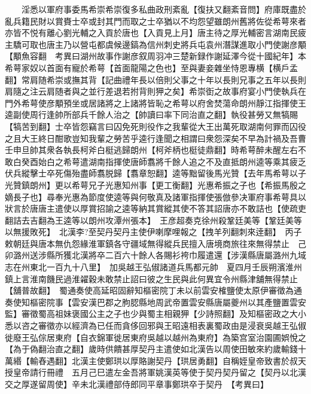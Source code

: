 　　淫悉以軍府事委馬希崇希崇復多私曲政刑紊亂【復扶又翻紊音問】府庫既盡於亂兵籍民財以賞賚士卒或封其門而取之士卒猶以不均怨望雖朗州舊將佐從希萼來者亦皆不悦有離心劉光輔之入貢於唐也【入貢見上月】唐主待之厚光輔密言湖南民疲主驕可取也唐主乃以營屯都虞候邊鎬為信州刺史將兵屯袁州潛謀進取小門使謝彦顒【顒魚容翻　考異曰湖州故事作謝彦叙周羽冲三楚新録作謝延澤今從十國紀年】本希萼家奴以首面有寵於希萼【首面龍陽之色也】至與妻妾雜坐恃恩專横【横戶孟翻】常肩随希崇或撫其背【記曲禮年長以倍則父事之十年以長則兄事之五年以長則肩隨之注云肩随者與之並行差退若拊背則狎之矣】希崇衘之故事府宴小門使執兵在門外希萼使彦顒預坐或居諸將之上諸將皆恥之希萼以府舍焚蕩命朗州靜江指揮使王逵副使周行逢帥所部兵千餘人治之【帥讀曰率下同治直之翻】執役甚勞又無犒賜【犒苦到翻】士卒皆怨竊言曰囚免死則役作之我輩從大王出萬死取湖南何罪而囚役之且大王終日酣歌豈知我輩之勞苦乎逵行逢聞之相謂曰衆怨深矣不早為計禍及吾曹壬申旦帥其衆各執長柯斧白梃逃歸朗州【柯斧柄也梃徒鼎翻】時希萼醉未醒左右不敢白癸酉始白之希萼遣湖南指揮使唐師翥將千餘人追之不及直抵朗州逵等乘其疲乏伏兵縱擊士卒死傷殆盡師翥脱歸【翥章恕翻】逵等黜留後馬光贊【去年馬希萼以子光贊鎮朗州】更以希萼兄子光惠知州事【更工衡翻】光惠希振之子也【希振馬殷之嫡長子也】尋奉光惠為節度使逵等與何敬真及諸軍指揮使張倣參决軍府事希萼具以狀言於唐唐主遣使以厚賞招諭之逵等納其賞縱其使不答其詔唐亦不敢詰也【使疏吏翻詰去吉翻為王逵等以朗州攻潭州張本】　王彦超奏克徐州殺鞏廷美等【鞏廷美等以無援敗死】　北漢李?至契丹契丹主使伊喇摩哩報之【拽羊列翻刺來逹翻】　丙子敕朝廷與唐本無仇怨緣淮軍鎮各守疆域無得縱兵民擅入唐境商旅往來無得禁止　己卯潞州送涉縣所獲北漢將卒二百六十餘人各賜衫袴巾履遣還【涉漢縣唐屬潞州九域志在州東北一百九十八里】　加吳越王弘俶諸道兵馬都元帥　夏四月壬辰朔濱淮州鎮上言淮南饑民過淮糴穀未敢禁止詔曰彼之生民與此何異宜令州縣津舖無得禁止【舖普故翻】　蜀通奏使高延昭固辭知樞密院丁未以前雲安榷鹽使太原伊審徵為通奏使知樞密院事【雲安漢巴郡之朐䏰縣地周武帝置雲安縣唐屬夔州以其產鹽置雲安監】審徵蜀高祖妹褒國公主之子也少與蜀主相親狎【少詩照翻】及知樞密政之大小悉以咨之審徵亦以經濟為已任而貪侈回邪與王昭遠相表裏蜀政由是浸衰吳越王弘俶徙廢王弘倧居東府【自衣錦軍徙居東府吳越以越州為東府】為築宫室治園圃娯悅之【為于偽翻治直之翻】歲時供饋甚厚契丹主遣使如北漢告以周使田敏來約歲輸錢十萬緡【輸舂遇翻】北漢主使鄭珙以厚賂謝契丹【珙居勇翻】自稱姪皇帝致書於叔天授皇帝請行冊禮　五月己巳遣左金吾將軍姚漢英等使于契丹契丹留之【契丹以北漢交之厚遂留周使】辛未北漢禮部侍郎同平章事鄭珙卒于契丹　【考異曰】

